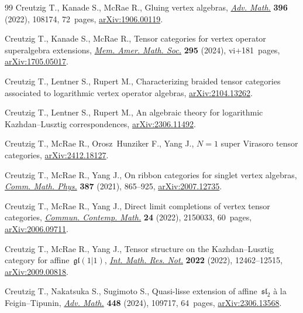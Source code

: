 \documentclass[pdftex]{sigma}
\numberwithin{equation}{section}
\theoremstyle{definition}
\begin{document}
\begin{thebibliography}{99}
Creutzig T., Kanade S., McRae R., Gluing vertex algebras,
 \href{https://doi.org/10.1016/j.aim.2021.108174}{\textit{Adv. Math.}}
 \textbf{396} (2022), 108174, 72~pages,
 \href{http://arxiv.org/abs/1906.00119}{arXiv:1906.00119}.

Creutzig T., Kanade S., McRae R., Tensor categories for vertex operator
 superalgebra extensions,
 \href{https://doi.org/10.1090/memo/1472}{\textit{Mem. Amer. Math. Soc.}}
 \textbf{295} (2024), vi+181~pages,
 \href{http://arxiv.org/abs/1705.05017}{arXiv:1705.05017}.

Creutzig T., Lentner S., Rupert M., Characterizing braided tensor categories
 associated to logarithmic vertex operator algebras,
 \href{http://arxiv.org/abs/2104.13262}{arXiv:2104.13262}.

Creutzig T., Lentner S., Rupert M., An algebraic theory for logarithmic
 {K}azhdan--{L}usztig correspondences,
 \href{http://arxiv.org/abs/2306.11492}{arXiv:2306.11492}.

Creutzig T., McRae R., Orosz~Hunziker F., Yang J., $N=1$ super Virasoro tensor
 categories, \href{http://arxiv.org/abs/2412.18127}{arXiv:2412.18127}.

Creutzig T., McRae R., Yang J., On ribbon categories for singlet vertex
 algebras, \href{https://doi.org/10.1007/s00220-021-04097-9}{\textit{Comm.
 Math. Phys.}} \textbf{387} (2021), 865--925,
 \href{http://arxiv.org/abs/2007.12735}{arXiv:2007.12735}.

Creutzig T., McRae R., Yang J., Direct limit completions of vertex tensor
 categories, \href{https://doi.org/10.1142/S0219199721500334}{\textit{Commun.
 Contemp. Math.}} \textbf{24} (2022), 2150033, 60~pages,
 \href{http://arxiv.org/abs/2006.09711}{arXiv:2006.09711}.

Creutzig T., McRae R., Yang J., Tensor structure on the {K}azhdan--{L}usztig
 category for affine~$\mathfrak{gl}(1|1)$,
 \href{https://doi.org/10.1093/imrn/rnab080}{\textit{Int. Math. Res. Not.}}
 \textbf{2022} (2022), 12462--12515,
 \href{http://arxiv.org/abs/2009.00818}{arXiv:2009.00818}.

Creutzig T., Nakatsuka S., Sugimoto S., Quasi-lisse extension of
 affine~$\mathfrak{sl}_2$ \`a la {F}eigin--{T}ipunin,
 \href{https://doi.org/10.1016/j.aim.2024.109717}{\textit{Adv. Math.}}
 \textbf{448} (2024), 109717, 64~pages,
 \href{http://arxiv.org/abs/2306.13568}{arXiv:2306.13568}.


\end{thebibliography}
\end{document}
